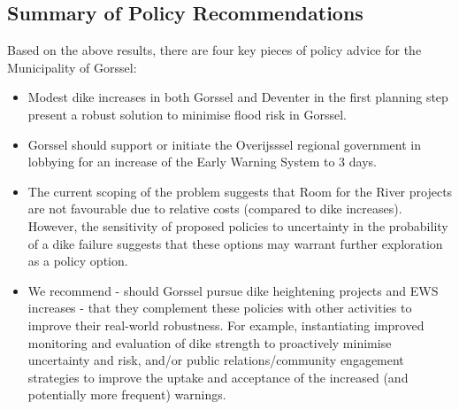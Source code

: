 \subsection{Summary of Policy Recommendations}
Based on the above results, there are four key pieces of policy advice for the Municipality of Gorssel:
\begin{itemize}
    \item Modest dike increases in both Gorssel and Deventer in the first planning step present a robust solution to minimise flood risk in Gorssel.
    \item Gorssel should support or initiate the Overijsssel regional government in lobbying for an increase of the Early Warning System to 3 days.
    \item The current scoping of the problem suggests that Room for the River projects are not favourable due to relative costs (compared to dike increases). However, the sensitivity of proposed policies to uncertainty in the probability of a dike failure suggests that these options may warrant further exploration as a policy option.
    \item We recommend - should Gorssel pursue dike heightening projects and EWS increases - that they complement these policies with other activities to improve their real-world robustness. For example, instantiating improved monitoring and evaluation of dike strength to proactively minimise uncertainty and risk, and/or public relations/community engagement strategies to improve the uptake and acceptance of the increased (and potentially more frequent) warnings.
\end{itemize}